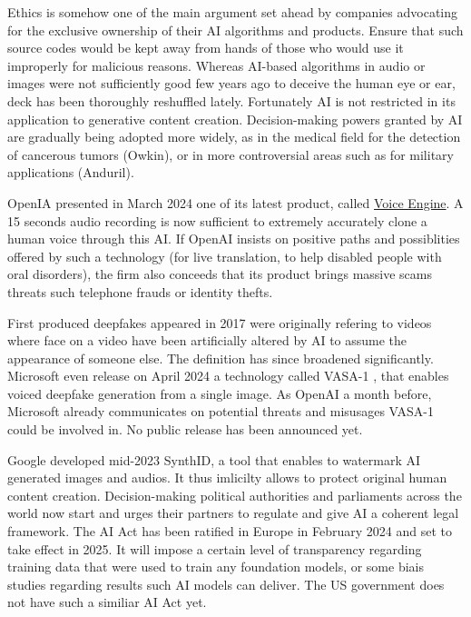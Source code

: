 Ethics is somehow one of the main argument set ahead by companies advocating for the exclusive ownership of their \ac{AI} algorithms and products. Ensure that such source codes would be kept away from hands of those who would use it improperly for malicious reasons. Whereas \ac{AI}-based algorithms in audio or images were not sufficiently good few years ago to deceive the human eye or ear, deck has been thoroughly reshuffled lately. Fortunately \ac{AI} is not restricted in its application to generative content creation. Decision-making powers granted by \ac{AI} are gradually being adopted more widely, as in the medical field for the detection of cancerous tumors (Owkin), or in more controversial areas such as for military applications (Anduril).

OpenIA presented in March 2024 one of its latest product, called \href{https://openai.com/blog/navigating-the-challenges-and-opportunities-of-synthetic-voices}{Voice Engine}. A 15 seconds audio recording is now sufficient to extremely accurately clone a human voice through this \ac{AI}. If OpenAI insists on positive paths and possiblities offered by such a technology (for live translation, to help disabled people with oral disorders), the firm also conceeds that its product brings massive scams threats such telephone frauds or identity thefts. 

First produced deepfakes appeared in 2017 were originally refering to videos where face on a video have been artificially altered by AI to assume the appearance of someone else. The definition has since broadened significantly. Microsoft even release on April 2024 a technology called VASA-1 \citep{xu2024vasa1}, that enables voiced deepfake generation from a single image. As OpenAI a month before, Microsoft already communicates on potential threats and misusages VASA-1 could be involved in. No public release has been announced yet. 

Google developed mid-2023 SynthID, a tool that enables to watermark \ac{AI} generated images and audios. It thus imlicilty allows to protect original human content creation. Decision-making political authorities and parliaments across the world now start and urges their partners to regulate and give \ac{AI} a coherent legal framework. The AI Act has been ratified in Europe in February 2024 and set to take effect in 2025. It will impose a certain level of transparency regarding training data that were used to train any foundation models, or some biais studies regarding results such \ac{AI} models can deliver. The US government does not have such a similiar AI Act yet. 


